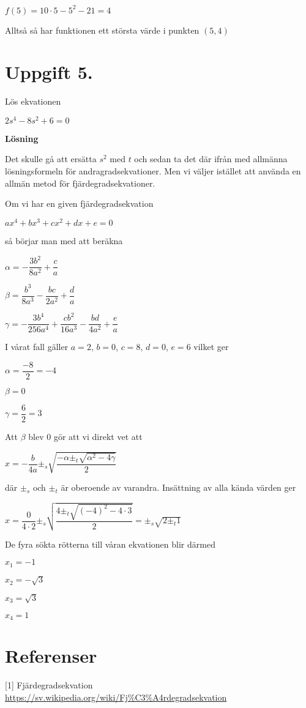 \documentclass{article}
\begin{document}
$f(5)=10\cdot5-5^2-21=4$

Alltså så har funktionen ett största värde i punkten $(5,4)$

\section*{Uppgift 5.}
Lös ekvationen

$2s^4-8s^2+6=0$

\textbf{Lösning}

Det skulle gå att ersätta $s^2$ med $t$ och sedan ta det där ifrån med allmänna lösningsformeln för andragradsekvationer. Men vi väljer istället att använda en allmän metod för fjärdegradsekvationer.

Om vi har en given fjärdegradsekvation

$ax^4+bx^3+cx^2+dx+e=0$

så börjar man med att beräkna 

$\alpha = -\dfrac{3b^2}{8a^2} + \dfrac{c}{a}$

$\beta = \dfrac{b^3}{8a^3} - \dfrac{bc}{2a^2} + \dfrac{d}{a}$

$\gamma = -\dfrac{3b^4}{256a^4} + \dfrac{cb^2}{16a^3} - \dfrac{bd}{4a^2} + \dfrac{e}{a}$

I vårat fall gäller $a=2$, $b=0$, $c=8$, $d=0$, $e=6$ vilket ger

$\alpha = \dfrac{-8}{2} = -4$

$\beta = 0$

$\gamma = \dfrac{6}{2} = 3$

Att $\beta$ blev $0$ gör att vi direkt vet att 

$x = -\dfrac{b}{4a}\pm_s\sqrt{\dfrac{-\alpha\pm_t\sqrt{\alpha^2-4\gamma}}{2}}$

där $\pm_s$ och $\pm_t$ är oberoende av varandra. Insättning av alla kända värden ger

$x = \dfrac{0}{4\cdot2}\pm_s \sqrt{\dfrac{4 \pm_t \sqrt{(-4)^2-4\cdot3}}{2}} = \pm_s \sqrt{2 \pm_t 1}$

De fyra sökta rötterna till våran ekvationen blir därmed

$x_1 = -1$

$x_2 = -\sqrt{3}$

$x_3 = \sqrt{3}$

$x_4 = 1$

\section*{Referenser}
[1] Fjärdegradsekvation\\
 \url{https://sv.wikipedia.org/wiki/Fj\%C3\%A4rdegradsekvation}
\end{document}
